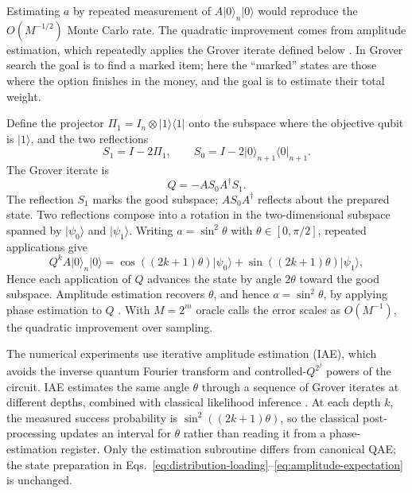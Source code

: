 \documentclass[12pt]{article}
\begin{document}
Estimating $a$ by repeated measurement of $A\lvert 0\rangle_n\lvert 0\rangle$ would reproduce the $O(M^{-1/2})$ Monte Carlo rate.  The quadratic improvement comes from amplitude estimation, which repeatedly applies the Grover iterate defined below \cite{brassardQuantumAmplitudeAmplification2002}.  In Grover search the goal is to find a marked item; here the ``marked'' states are those where the option finishes in the money, and the goal is to estimate their total weight.

Define the projector $\Pi_1 = I_n\otimes \lvert 1\rangle\langle 1\rvert$ onto the subspace where the objective qubit is $\lvert 1\rangle$, and the two reflections
\begin{equation}
    S_1 = I - 2\Pi_1,
    \qquad
    S_0 = I - 2\lvert 0\rangle_{n+1}\langle 0\rvert_{n+1}.
\end{equation}
The Grover iterate is
\begin{equation}
    Q = - A S_0 A^\dagger S_1.
    \label{eq:grover-iterate}
\end{equation}
The reflection $S_1$ marks the good subspace; $A S_0 A^\dagger$ reflects about the prepared state.  Two reflections compose into a rotation in the two-dimensional subspace spanned by $\lvert\psi_0\rangle$ and $\lvert\psi_1\rangle$.  Writing $a=\sin^2\theta$ with $\theta\in[0,\pi/2]$, repeated applications give
\begin{equation}
    Q^k A\lvert 0\rangle_n\lvert 0\rangle
    =
    \cos\!\left((2k+1)\theta\right)\lvert \psi_0\rangle
    +
    \sin\!\left((2k+1)\theta\right)\lvert \psi_1\rangle,
    \label{eq:grover-rotation}
\end{equation}
Hence each application of $Q$ advances the state by angle $2\theta$ toward the good subspace.  Amplitude estimation recovers $\theta$, and hence $a=\sin^2\theta$, by applying phase estimation to $Q$ \cite{brassardQuantumAmplitudeAmplification2002}.  With $M=2^m$ oracle calls the error scales as $O(M^{-1})$, the quadratic improvement over sampling.

The numerical experiments use iterative amplitude estimation (IAE), which avoids the inverse quantum Fourier transform and controlled-$Q^{2^j}$ powers of the circuit.  IAE estimates the same angle $\theta$ through a sequence of Grover iterates at different depths, combined with classical likelihood inference \cite{grinkoIterativeQuantumAmplitude2021,stamatopoulosOptionPricingUsing2020}.  At each depth $k$, the measured success probability is $\sin^2((2k+1)\theta)$, so the classical post-processing updates an interval for $\theta$ rather than reading it from a phase-estimation register.  Only the estimation subroutine differs from canonical QAE; the state preparation in Eqs.~\eqref{eq:distribution-loading}--\eqref{eq:amplitude-expectation} is unchanged.
\end{document}
